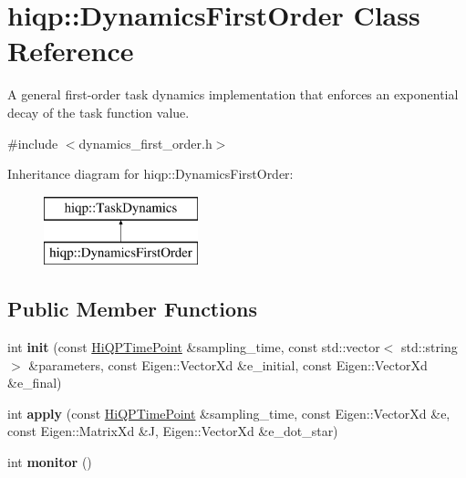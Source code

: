 \hypertarget{classhiqp_1_1DynamicsFirstOrder}{\section{hiqp\-:\-:Dynamics\-First\-Order Class Reference}
\label{classhiqp_1_1DynamicsFirstOrder}
}


A general first-\/order task dynamics implementation that enforces an exponential decay of the task function value.  




{\ttfamily \#include $<$dynamics\-\_\-first\-\_\-order.\-h$>$}

Inheritance diagram for hiqp\-:\-:Dynamics\-First\-Order\-:\begin{figure}[H]
\begin{center}
\leavevmode
\includegraphics[height=2.000000cm]{classhiqp_1_1DynamicsFirstOrder}
\end{center}
\end{figure}
\subsection*{Public Member Functions}
\begin{DoxyCompactItemize}
\item 
\hypertarget{classhiqp_1_1DynamicsFirstOrder_ad88c60190ac28f11cd8919070a8f3be3}{int {\bfseries init} (const \hyperlink{classhiqp_1_1HiQPTimePoint}{Hi\-Q\-P\-Time\-Point} \&sampling\-\_\-time, const std\-::vector$<$ std\-::string $>$ \&parameters, const Eigen\-::\-Vector\-Xd \&e\-\_\-initial, const Eigen\-::\-Vector\-Xd \&e\-\_\-final)}\label{classhiqp_1_1DynamicsFirstOrder_ad88c60190ac28f11cd8919070a8f3be3}

\item 
\hypertarget{classhiqp_1_1DynamicsFirstOrder_ae4496d42170a20c473d3e6a378cd2378}{int {\bfseries apply} (const \hyperlink{classhiqp_1_1HiQPTimePoint}{Hi\-Q\-P\-Time\-Point} \&sampling\-\_\-time, const Eigen\-::\-Vector\-Xd \&e, const Eigen\-::\-Matrix\-Xd \&J, Eigen\-::\-Vector\-Xd \&e\-\_\-dot\-\_\-star)}\label{classhiqp_1_1DynamicsFirstOrder_ae4496d42170a20c473d3e6a378cd2378}

\item 
\hypertarget{classhiqp_1_1DynamicsFirstOrder_ae0be939fb0e31fdc0a7e3736f5e332e3}{int {\bfseries monitor} ()}\label{classhiqp_1_1DynamicsFirstOrder_ae0be939fb0e31fdc0a7e3736f5e332e3}

\end{DoxyCompactItemize}
